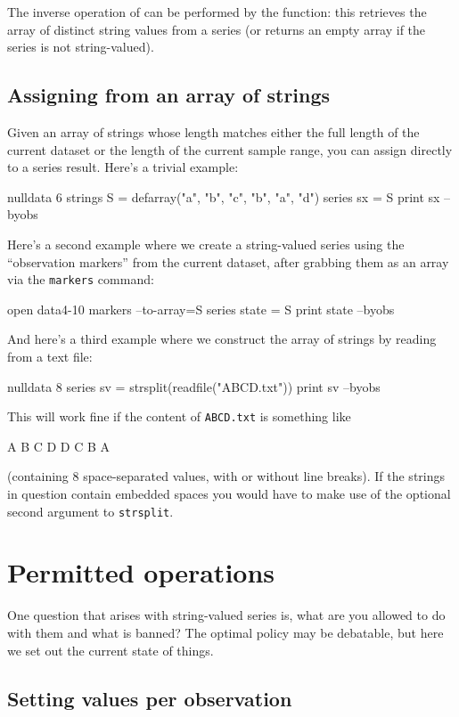 The inverse operation of  can be performed by the
 function: this retrieves the array of distinct string
values from a series (or returns an empty array if the series is not
string-valued).

\subsection{Assigning from an array of strings}
\label{sec:array-assign}

Given an array of strings whose length matches either the full length
of the current dataset or the length of the current sample range, you
can assign directly to a series result. Here's a trivial example:
\begin{code}
nulldata 6
strings S = defarray("a", "b", "c", "b", "a", "d")
series sx = S
print sx --byobs
\end{code}
Here's a second example where we create a string-valued series
using the ``observation markers'' from the current dataset, after
grabbing them as an array via the \texttt{markers} command:
\begin{code}
open data4-10
markers --to-array=S
series state = S
print state --byobs
\end{code}
And here's a third example where we construct the array of strings by
reading from a text file:
\begin{code}
nulldata 8
series sv = strsplit(readfile("ABCD.txt"))
print sv --byobs
\end{code}
This will work fine if the content of \texttt{ABCD.txt} is something
like
\begin{code}
A B C D D C B A
\end{code}
(containing 8 space-separated values, with or without line breaks). If
the strings in question contain embedded spaces you would have to make
use of the optional second argument to \texttt{strsplit}.

\section{Permitted operations}

One question that arises with string-valued series is, what are you
allowed to do with them and what is banned? The optimal policy may be
debatable, but here we set out the current state of things.

\subsection{Setting values per observation}

